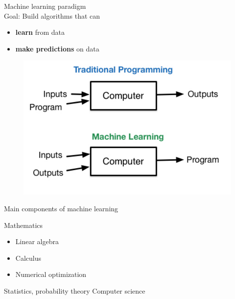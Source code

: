 \documentclass{beamer}
\begin{document}
\begin{frame}{Machine learning paradigm}
~\\
\vfill
Goal: Build algorithms that can 
\begin{itemize}
	\item \textbf{learn} from data
	\item \textbf{make predictions} on data
\end{itemize}
\vfill
\begin{figure}
\centering
\includegraphics[width=\textwidth]{images/ml_vs_traditional.png}
\end{figure}
\vfill
\end{frame}

\begin{frame}{Main components of machine learning}

\vfill
Mathematics
\begin{itemize}
	\item Linear algebra
	\item Calculus
	\item Numerical optimization
\end{itemize}
\vfill
Statistics, probability theory
\vfill
Computer science
\vfill

\end{frame}
\end{document}
